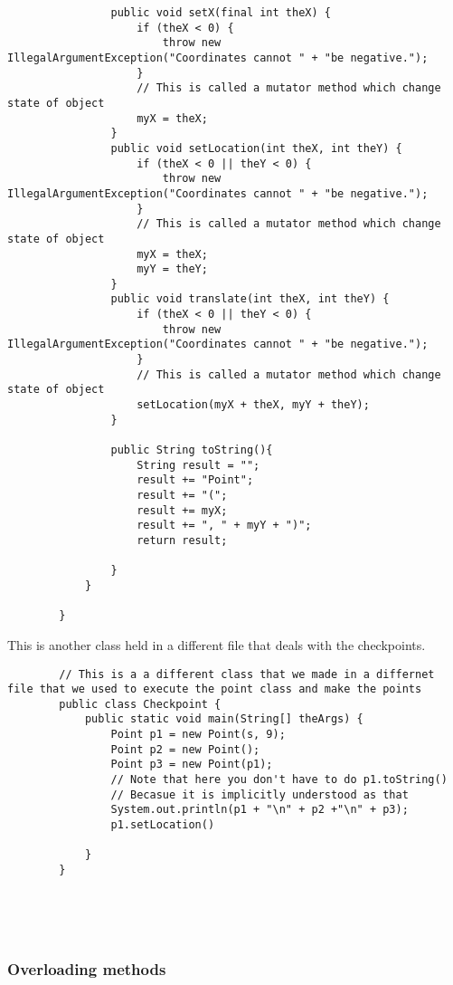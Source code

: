 \documentclass{article}
\begin{document}
\begin{lstlisting}
                public void setX(final int theX) {
                    if (theX < 0) {
                        throw new IllegalArgumentException("Coordinates cannot " + "be negative.");
                    }
                    // This is called a mutator method which change state of object 
                    myX = theX;
                }
                public void setLocation(int theX, int theY) {
                    if (theX < 0 || theY < 0) {
                        throw new IllegalArgumentException("Coordinates cannot " + "be negative.");
                    }
                    // This is called a mutator method which change state of object
                    myX = theX;
                    myY = theY;
                }
                public void translate(int theX, int theY) {
                    if (theX < 0 || theY < 0) {
                        throw new IllegalArgumentException("Coordinates cannot " + "be negative.");
                    }
                    // This is called a mutator method which change state of object
                    setLocation(myX + theX, myY + theY);
                }
        
                public String toString(){
                    String result = "";
                    result += "Point";
                    result += "(";
                    result += myX;
                    result += ", " + myY + ")";
                    return result; 
            
                }
            }    
            
        }
    \end{lstlisting}

    This is another class held in a different file that deals with the 
    checkpoints.
    \begin{lstlisting}
        // This is a a different class that we made in a differnet file that we used to execute the point class and make the points
        public class Checkpoint {
            public static void main(String[] theArgs) {
                Point p1 = new Point(s, 9);
                Point p2 = new Point();
                Point p3 = new Point(p1);
                // Note that here you don't have to do p1.toString()
                // Becasue it is implicitly understood as that 
                System.out.println(p1 + "\n" + p2 +"\n" + p3);
                p1.setLocation()

            }
        }





    \end{lstlisting}

    \subsubsection{Overloading methods}
        
\end{document}
